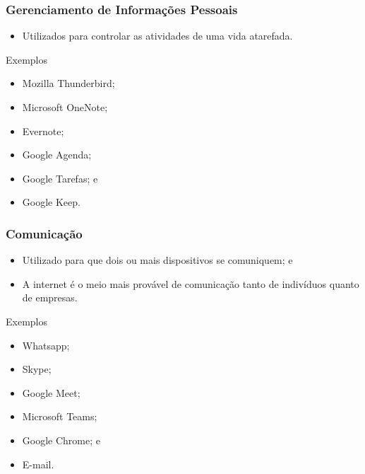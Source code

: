 \documentclass[aspectratio=169]{beamer} %
\begin{document}
\begin{frame}
	\frametitle{Gerenciamento de Informações Pessoais}
		
	\begin{itemize}
		\item Utilizados para controlar as atividades de uma vida atarefada.
	\end{itemize}\vfill
	
	\begin{exampleblock}{Exemplos}
	\begin{itemize}
		\item Mozilla Thunderbird;
		\item Microsoft OneNote;
		\item Evernote;
		\item Google Agenda;
		\item Google Tarefas; e 
		\item Google Keep.
	\end{itemize}	
	\end{exampleblock}
\end{frame}

\begin{frame}
	\frametitle{Comunica\c cão}
		
	\begin{itemize}
		\item Utilizado para que dois ou mais dispositivos se comuniquem; e
		\item A internet é o meio mais provável de comunicação tanto de indivíduos quanto de empresas.
	\end{itemize}\vfill
	
	\begin{exampleblock}{Exemplos}
	\begin{itemize}
		\item Whatsapp;
		\item Skype;
		\item Google Meet;
		\item Microsoft Teams;
		\item Google Chrome; e
		\item E-mail.
	\end{itemize}
	\end{exampleblock}
\end{frame}
\end{document}
